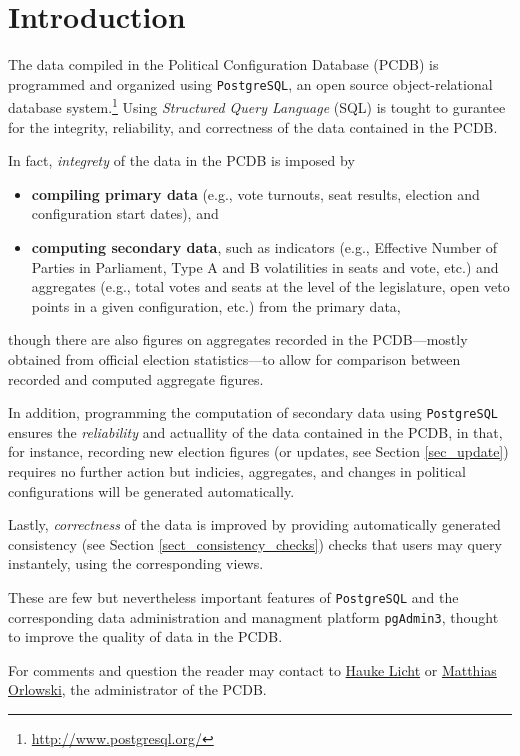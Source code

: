 \chapter{Introduction}\label{chap_introduction}

The data compiled in the Political Configuration Database (PCDB) is programmed and organized using \texttt{\txtfont PostgreSQL}, an open source object-relational database system.\footnote{\url{http://www.postgresql.org/}} 
Using \emph{Structured Query Language} (SQL) is tought to gurantee for the integrity, reliability, and correctness of the data contained in the PCDB.

In fact, \emph{integrety} of the data in the PCDB is imposed by 
\begin{itemize}
\item[]\textbf{compiling primary data} (e.g., vote turnouts, seat results, election and configuration start dates), and \item[]\textbf{computing secondary data}, such as indicators (e.g., Effective Number of Parties in Parliament, Type A and B volatilities in seats and vote, etc.) and aggregates (e.g., total votes and seats at the level of the legislature, open veto points in a given configuration, etc.) from the primary data,
\end{itemize}
though there are also figures on aggregates recorded in the PCDB---mostly obtained from official election statistics---to allow for comparison between recorded and computed aggregate figures.

In addition, programming the computation of secondary data using \texttt{\txtfont PostgreSQL} ensures the \emph{reliability} and actuallity of the data contained in the PCDB, in that, for instance, recording new election figures (or updates, see Section \ref{sec_update}) requires no further action but indicies, aggregates, and changes in political configurations will be generated automatically.

Lastly, \emph{correctness} of the data is improved by providing automatically generated consistency (see Section \ref{sect_consistency_checks}) checks that users may query instantely, using the corresponding views. 

These are few but nevertheless important features of \texttt{\txtfont PostgreSQL} and the corresponding data administration and managment platform \texttt{\txtfont pgAdmin3}, thought to improve the quality of data in the PCDB.

For comments and question the reader may contact to \href{mailto:hauke.licht.1@hu-berlin.de}{Hauke Licht} or \href{mailto:matthias.orlowski@hu-berlin.de}{Matthias Orlowski}, the administrator of the PCDB.
